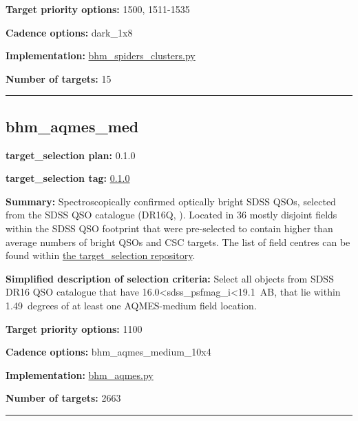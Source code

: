 \noindent\textbf{Target priority options:} 1500, 1511-1535

\noindent\textbf{Cadence options:} dark\_1x8

\noindent\textbf{Implementation:}
\href{https://github.com/sdss/target_selection/blob/0.1.0/python/target_selection/cartons/bhm_spiders_clusters.py}{bhm\_spiders\_clusters.py}

\noindent\textbf{Number of targets:} 15

\begin{center}\rule{0.5\linewidth}{0.5pt}\end{center}

\hypertarget{bhm_aqmes_med_plan0.1.0}{%
\subsection{bhm\_aqmes\_med}\label{bhm_aqmes_med_plan0.1.0}}

\noindent\textbf{target\_selection plan:} 0.1.0

\noindent\textbf{target\_selection tag:}
\href{https://github.com/sdss/target_selection/tree/0.1.0/}{0.1.0}

\noindent\textbf{Summary:} Spectroscopically confirmed optically bright SDSS
QSOs, selected from the SDSS QSO catalogue (DR16Q,
\citealt{Lyke2020}). Located in 36 mostly disjoint fields within the SDSS QSO
footprint that were pre-selected to contain higher than average numbers
of bright QSOs and CSC targets. The list of field centres can be found
within
\href{https://github.com/sdss/target_selection/blob/0.1.0/python/target_selection/masks/candidate_target_fields_bhm_aqmes_med_v0.2.1.fits}{the
target\_selection repository}.

\noindent\textbf{Simplified description of selection criteria:} Select all
objects from SDSS DR16 QSO catalogue that have
16.0\textless sdss\_psfmag\_i\textless19.1~AB, that lie within
1.49~degrees of at least one AQMES-medium field location.


\noindent\textbf{Target priority options:} 1100

\noindent\textbf{Cadence options:} bhm\_aqmes\_medium\_10x4

\noindent\textbf{Implementation:}
\href{https://github.com/sdss/target_selection/blob/0.1.0/python/target_selection/cartons/bhm_aqmes.py}{bhm\_aqmes.py}

\noindent\textbf{Number of targets:} 2663

\begin{center}\rule{0.5\linewidth}{0.5pt}\end{center}


